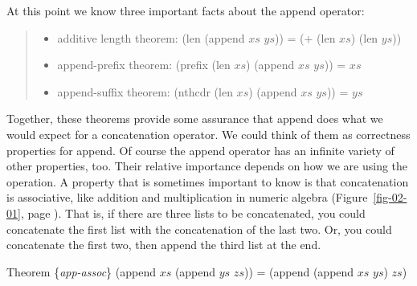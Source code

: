 
At this point we know three important facts about the append operator:
\begin{quote}
\begin{itemize}
\item additive length theorem: (len (append $xs$ $ys$)) = (+ (len $xs$) (len $ys$))
\label{app-pfx-thm}
\item append-prefix theorem: (prefix (len $xs$) (append $xs$ $ys$)) = $xs$
\item append-suffix theorem: (nthcdr (len $xs$) (append $xs$ $ys$)) = $ys$
\end{itemize}
\end{quote}

Together, these theorems provide some assurance that append does what we
would expect for a concatenation operator.
We could think of them as
correctness properties
for append.
Of course the append operator has
an infinite variety of other properties, too.
Their relative importance depends on how we are using the operation.
A property that is sometimes important to know is that concatenation is associative,
like addition and multiplication in numeric algebra
(Figure~\ref{fig-02-01}, page \pageref{fig-02-01}).
That is, if there are three lists to be concatenated,
you could concatenate the first list with the concatenation of the last two.
Or, you could concatenate the first two, then append the third list at the end.

\begin{samepage}
\label{app-assoc}
\begin{center}
Theorem \{\emph{app-assoc}\} (append $xs$ (append $ys$ $zs$)) = (append (append $xs$ $ys$) $zs$)
\end{center}
\end{samepage}


